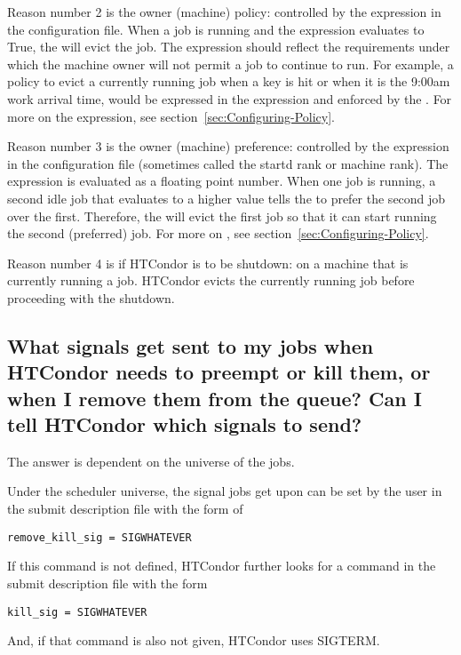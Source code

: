 Reason number 2 is the owner (machine) policy:
controlled by the  expression in the configuration file.
When a job is running and the  expression
evaluates to True,
the  will evict the job.
The  expression should reflect 
the requirements under which the machine owner will not permit
a job to continue to run.
For example, a policy to evict a currently running job when a key is hit
or when it is the 9:00am work arrival time,
would be expressed in the  expression 
and enforced by the .
For more on the  expression,
see section~\ref{sec:Configuring-Policy}.

Reason number 3 is the owner (machine) preference:
controlled by the  expression in the 
configuration file (sometimes called the startd rank or machine rank).
The  expression is evaluated as a floating point number.
When one job is running, a second idle job that evaluates to a higher
 value 
tells the  to prefer the second job over the first.
Therefore, the  will evict the first 
job so that it can start running the second (preferred) job.
For more on ,
see section~\ref{sec:Configuring-Policy}.

Reason number 4 is if HTCondor is to be shutdown:
on a machine that is currently running a job.
HTCondor evicts the currently running job before proceeding
with the shutdown.

\subsection*{What signals get sent to my jobs when HTCondor needs to preempt or kill them, or when I remove them from the queue?  Can I tell HTCondor which signals to send?}

The answer is dependent on the universe of the jobs.

Under the scheduler universe,
the signal jobs get upon  can be set by
the user in the submit description file with the form of
\begin{verbatim}
remove_kill_sig = SIGWHATEVER
\end{verbatim}
If this command is not defined, 
HTCondor further looks for a command 
in the submit description file with the form
\begin{verbatim}
kill_sig = SIGWHATEVER
\end{verbatim}
And, if that command is also not given,
HTCondor uses SIGTERM.


